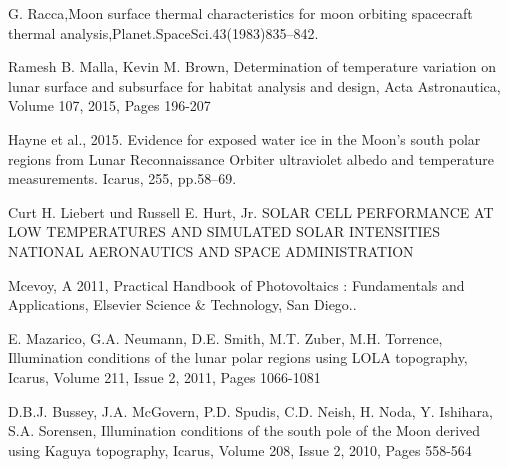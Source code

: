 \documentclass{beamer}
\begin{document}
\begin{thebibliography}{99}
G. Racca,Moon surface thermal characteristics for moon orbiting
spacecraft thermal analysis,Planet.SpaceSci.43(1983)835–842.

Ramesh B. Malla, Kevin M. Brown,
Determination of temperature variation on lunar surface and subsurface for habitat analysis and design,
Acta Astronautica,
Volume 107,
2015,
Pages 196-207

Hayne et al., 2015. Evidence for exposed water ice in the Moon’s south polar regions from Lunar Reconnaissance Orbiter ultraviolet albedo and temperature measurements. Icarus, 255, pp.58–69.


Curt H. Liebert und Russell E. Hurt, Jr. SOLAR CELL PERFORMANCE
AT LOW TEMPERATURES AND
SIMULATED SOLAR INTENSITIES
NATIONAL AERONAUTICS AND SPACE ADMINISTRATION

Mcevoy, A 2011, Practical Handbook of Photovoltaics : Fundamentals and Applications, Elsevier Science \& Technology, San Diego..

E. Mazarico, G.A. Neumann, D.E. Smith, M.T. Zuber, M.H. Torrence,
Illumination conditions of the lunar polar regions using LOLA topography,
Icarus,
Volume 211, Issue 2,
2011,
Pages 1066-1081


D.B.J. Bussey, J.A. McGovern, P.D. Spudis, C.D. Neish, H. Noda, Y. Ishihara, S.A. Sorensen,
Illumination conditions of the south pole of the Moon derived using Kaguya topography,
Icarus,
Volume 208, Issue 2,
2010,
Pages 558-564

\end{thebibliography}
\end{document}
